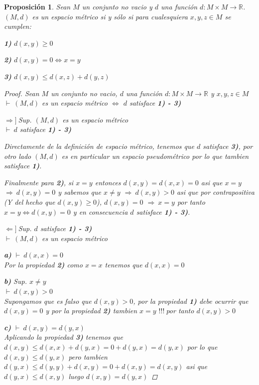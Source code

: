 \documentclass[oneside]{book} %
\theoremstyle{Teorema}
\newtheorem{Proposicion}[Definicion]{Proposición}
\theoremstyle{Ejemplos}
\theoremstyle{[Obs]}
\renewcommand{\{}{\left\lbrace} %
\renewcommand{\}}{\right\rbrace} %
\newcommand{\R}{\mathbb{R}} %
\newcommand{\pd}{$\vdash\ $} %
\renewcommand{\c}{$!!!\ $} %
\newcommand{\necesidad}{$\Rightarrow]\ $} %
\newcommand{\suficiencia}{$\Leftarrow]\ $} %
\newcommand{\Imp}{$\Rightarrow\ $} %
\begin{document}
			\begin{Proposicion}\setlength{\parindent}{0em}

				Sean $M$ un conjunto no vacio y $d$ una función $d : M \times M \to \R$. $(M, d)$ es un espacio métrico si y sólo si para cualesquiera $x, y, z \in M$ se cumplen: 

				\textbf{1)} $d(x, y) \geq 0$ 

				\textbf{2)} $d(x, y) = 0 \Leftrightarrow x = y$ 

				\textbf{3)} $d(x, y) \leq d(x, z) + d(y, z)$
				
				\begin{proof}
					
					Sean $M$ un conjunto no vacio, $d$ una función $d : M \times M \to \R$ y $x, y, z \in M$ \\
					\pd $(M, d)$ es un espacio métrico $\Leftrightarrow$ $d$ satisface \textbf{1) - 3)}

					\necesidad Sup. $(M, d)$ es un espacio métrico \\
					\pd $d$ satisface \textbf{1) - 3)}

					Directamente de la definición de espacio métrico, tenemos que $d$ satisface \textbf{3)}, por otro lado $(M, d)$ es en particular un espacio pseudométrico por lo que tambien satisface \textbf{1)}.
					
					Finalmente para \textbf{2)}, si $x = y$ entonces $d(x, y) = d(x, x) = 0$ asi que $x = y$ \Imp $d(x, y) = 0$ y sabemos que $x \neq y$ \Imp $d(x, y) > 0$ asi que por contrapositiva (Y del hecho que $d(x, y) \geq 0$), $d(x, y) = 0$ \Imp $x = y$ por tanto $x = y \Leftrightarrow d(x, y) = 0$ y en consecuencia $d$ satisface \textbf{1) - 3)}.

					\suficiencia Sup. $d$ satisface \textbf{1) - 3)} \\
					\pd $(M, d)$ es un espacio métrico

					\textbf{a)} \pd $d(x, x) = 0$ \\
					Por la propiedad \textbf{2)} como $x = x$ tenemos que $d(x, x) = 0$

					\textbf{b)} Sup. $x \neq y$ \\
					\pd $d(x, y) > 0$ \\
					Supongamos que es falso que $d(x, y) > 0$, por la propiedad \textbf{1)} debe ocurrir que $d(x, y) = 0$ y por la propiedad \textbf{2)} tambien $x = y$ \c por tanto $d(x, y) > 0$

					\textbf{c)} \pd $d(x, y) = d(y, x)$ \\
					Aplicando la propiedad \textbf{3)} tenemos que $d(x, y) \leq d(x, x) + d(y, x) = 0 + d(y, x) = d(y, x)$ por lo que $d(x, y) \leq d(y, x)$ pero tambien $d(y, x) \leq d(y, y) + d(x, y) = 0 + d(x, y) = d(x, y)$ asi que $d(y, x) \leq d(x, y)$ luego $d(x, y) = d(y, x)$ 


\end{proof}
\end{Proposicion}
\end{document}
